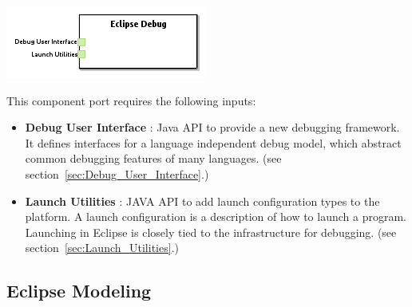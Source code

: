 \documentclass{gemoc} %
\begin{document}
\begin{center}
\includegraphics*[trim=0.0cm 0.0cm 0cm 0.0cm, clip=true]{../images/generated/Generated_Eclipse_Debug.png}
\end{center}

This component port requires the following inputs:
\begin{itemize}
  \item \textbf{Debug User Interface} :
Java API to provide a new debugging framework. It defines interfaces for a language independent debug model, which abstract common debugging features of many languages. 
(see section~\ref{sec:Debug_User_Interface}.)
  \item \textbf{Launch Utilities} :
JAVA API to add launch configuration types to the platform. A launch configuration is a description of how to launch a program. Launching in Eclipse is closely tied to the infrastructure for debugging.
(see section~\ref{sec:Launch_Utilities}.)
\end{itemize}



\subsection{Eclipse Modeling}
\label{sec:Eclipse_Modeling}

\end{document}

